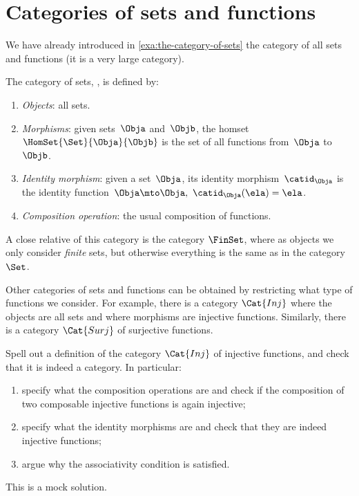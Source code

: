 
\section{Categories of sets and functions}

We have already introduced in \cref{exa:the-category-of-sets} the category of all sets and functions (it is a very large category). 

\begin{ctdefinition}
    \label{def:Set}
    The category of sets, \iindex{\Set}, is defined by:
    \begin{enumerate}
        \item \emph{Objects}: all sets.
        \item \emph{Morphisms}: given sets~$\Obja$ and~$\Objb$, the homset~$\HomSet{\Set}{\Obja}{\Objb}$ is the set of all functions from~$\Obja$ to~$\Objb$.
        \item \emph{Identity morphism}: given a set~$\Obja$, its identity morphism~$\catid_\Obja$ is the identity function~$\Obja \mto \Obja, \ \catid_\Obja(\ela) = \ela$.
        \item \emph{Composition operation}: the usual composition of functions.
    \end{enumerate}
\end{ctdefinition}

A close relative of this category is the category $\FinSet$, where as objects we only consider \emph{finite} sets, but otherwise everything is the same as in the category $\Set$. 

Other categories of sets and functions can be obtained by restricting what type of functions we consider. For example, there is a category $\Cat{Inj}$ where the objects are all sets and where morphisms are injective functions. Similarly, there is a category $\Cat{Surj}$ of surjective functions. 

\begin{exercise}
Spell out a definition of the category $\Cat{Inj}$ of injective functions, and check that it is indeed a category. In particular:
\begin{enumerate}
\item specify what the composition operations are and check if the composition of two composable injective functions is again injective;
\item specify what the identity morphisms are and check that they are indeed injective functions;
\item argue why the associativity condition is satisfied. 
\end{enumerate}
\end{exercise}

\begin{solution}
This is a mock solution. 
\end{solution}

